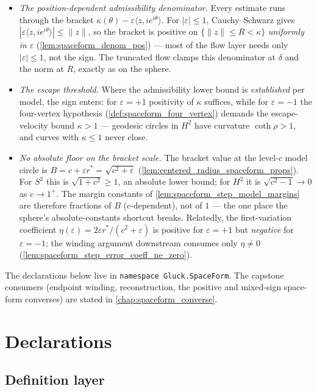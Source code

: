 \begin{itemize}
\item \emph{The position-dependent admissibility denominator.} Every estimate
  runs through the bracket
  $\kappa(\theta)-\varepsilon\langle z, ie^{i\theta}\rangle$. For
  $|\varepsilon|\le1$, Cauchy--Schwarz gives
  $|\varepsilon\langle z, ie^{i\theta}\rangle|\le\|z\|$, so the bracket is
  positive on $\{\|z\|\le R<\kappa\}$ \emph{uniformly in} $\varepsilon$
  (\cref{lem:spaceform_denom_pos}) — most of the flow layer needs only
  $|\varepsilon|\le1$, not the sign. The truncated flow clamps this
  denominator at $\delta$ and the norm at $R$, exactly as on the sphere.
\item \emph{The escape threshold.} Where the admissibility lower bound is
  \emph{established} per model, the sign enters: for $\varepsilon=+1$
  positivity of $\kappa$ suffices, while for $\varepsilon=-1$ the four-vertex
  hypothesis (\cref{def:spaceform_four_vertex}) demands the escape-velocity
  bound $\kappa>1$ — geodesic circles in $H^2$ have curvature
  $\coth\rho>1$, and curves with $\kappa\le1$ never close.
\item \emph{No absolute floor on the bracket scale.} The bracket value at the
  level-$c$ model circle is $B=c+\varepsilon r^\ast=\sqrt{c^2+\varepsilon}$
  (\cref{lem:centered_radius_spaceform_props}). For $S^2$ this is
  $\sqrt{1+c^2}\ge1$, an absolute lower bound; for $H^2$ it is
  $\sqrt{c^2-1}\to0$ as $c\to1^{+}$. The margin constants of
  \cref{lem:spaceform_step_model_margins} are therefore fractions of $B$
  ($c$-dependent), not of $1$ — the one place the sphere's
  absolute-constants shortcut breaks. Relatedly, the first-variation
  coefficient $\eta(\varepsilon)=2\varepsilon r^\ast/(c^2+\varepsilon)$
  is positive for $\varepsilon=+1$ but \emph{negative} for
  $\varepsilon=-1$; the winding argument downstream consumes only
  $\eta\ne0$ (\cref{lem:spaceform_step_error_coeff_ne_zero}).
\end{itemize}

The declarations below live in \texttt{namespace Gluck.SpaceForm}. The
capstone consumers (endpoint winding, reconstruction, the positive and
mixed-sign space-form converses) are stated in \cref{chap:spaceform_converse}.

\section{Declarations}

\subsection{Definition layer}

